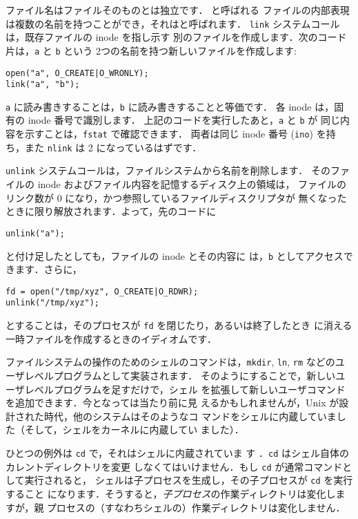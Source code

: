 ファイル名はファイルそのものとは独立です． と呼ばれる
ファイルの内部表現は複数の名前を持つことができ，それはと呼ばれます．
\lstinline{link} システムコールは，既存ファイルの inode を指し示す
別のファイルを作成します．次のコード片は，\lstinline{a} と \lstinline{b} という
2つの名前を持つ新しいファイルを作成します:
\begin{lstlisting}[]
open("a", O_CREATE|O_WRONLY); 
link("a", "b");
\end{lstlisting}
\lstinline{a} に読み書きすることは，\lstinline{b} に読み書きすることと等価です．
各 inode は，固有の inode 番号で識別します．
上記のコードを実行したあと，\lstinline{a} と \lstinline{b} が
同じ内容を示すことは，\lstinline{fstat} で確認できます．
両者は同じ inode 番号 (\lstinline{ino}) を持ち，また \lstinline{nlink} は
2 になっているはずです．


\lstinline{unlink} システムコールは，ファイルシステムから名前を削除します．
そのファイルの inode およびファイル内容を記憶するディスク上の領域は，
ファイルのリンク数が 0 になり，かつ参照しているファイルディスクリプタが
無くなったときに限り解放されます．よって，先のコードに
\begin{lstlisting}[]
unlink("a");
\end{lstlisting}
と付け足したとしても，ファイルの inode とその内容に
は，\lstinline{b} としてアクセスできます．さらに，
\begin{lstlisting}[]
fd = open("/tmp/xyz", O_CREATE|O_RDWR); 
unlink("/tmp/xyz");
\end{lstlisting}
とすることは，そのプロセスが \lstinline{fd} を閉じたり，あるいは終了したとき
に消える一時ファイルを作成するときのイディオムです．


ファイルシステムの操作のためのシェルのコマンドは，\lstinline{mkdir},
\lstinline{ln}, \lstinline{rm} などのユーザレベルプログラムとして実装されます．
そのようにすることで，新しいユーザレベルプログラムを足すだけで，シェル
を拡張して新しいユーザコマンドを追加できます．今となっては当たり前に見
えるかもしれませんが，Unix が設計された時代，他のシステムはそのようなコ
マンドをシェルに内蔵していました（そして，シェルをカーネルに内蔵してい
ました）．

ひとつの例外は \lstinline{cd} で，それはシェルに内蔵されていま
す ．\lstinline{cd} はシェル自体のカレントディレクトリを変更
しなくてはいけません．もし \lstinline{cd} が通常コマンドとして実行されると，
シェルは子プロセスを生成し，その子プロセスが \lstinline{cd} を実行すること
になります．そうすると，\textit{子プロセス}の作業ディレクトリは変化しますが，親
プロセスの（すなわちシェルの）作業ディレクトリは変化しません．

